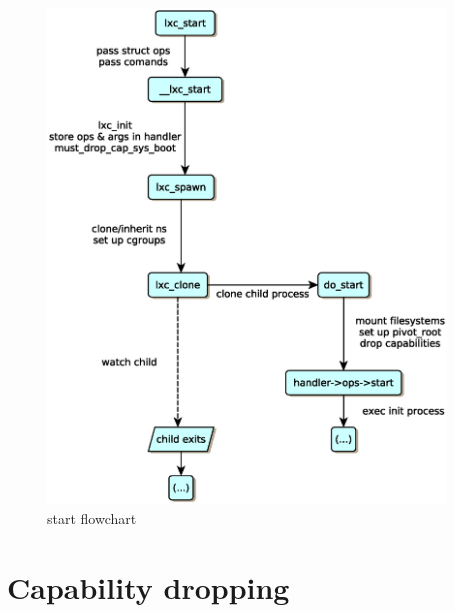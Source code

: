 \begin{figure}[htb]
\begin{center}
  \includegraphics[width=300pt]{fig/figure_1.eps}
  \caption{start flowchart}
  \label{figure_1}
\end{center}
\end{figure}

\section{Capability dropping}\label{caps}

